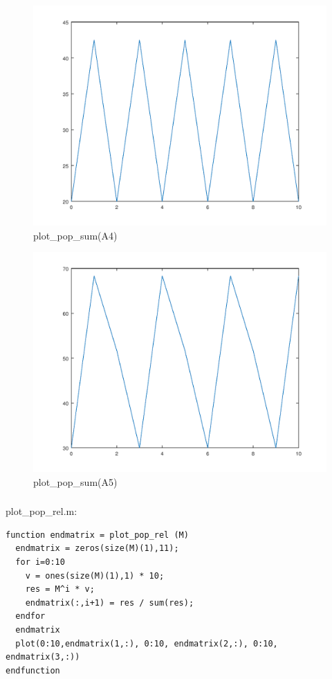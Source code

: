 \documentclass{article}
\begin{document}
\begin{figure}[H]
\centering
\includegraphics[scale=0.5]{plotA4.png}
\caption{plot\_pop\_sum(A4)}
\label{fig:universe}
\end{figure}

\begin{figure}[H]
\centering
\includegraphics[scale=0.5]{plotA5.png}
\caption{plot\_pop\_sum(A5)}
\label{fig:universe}
\end{figure}

\subsubsection{}
plot\_pop\_rel.m:
\begin{lstlisting}
function endmatrix = plot_pop_rel (M)
  endmatrix = zeros(size(M)(1),11);
  for i=0:10
    v = ones(size(M)(1),1) * 10;
    res = M^i * v;
    endmatrix(:,i+1) = res / sum(res);
  endfor
  endmatrix
  plot(0:10,endmatrix(1,:), 0:10, endmatrix(2,:), 0:10, endmatrix(3,:))
endfunction
\end{lstlisting}
\end{document}

